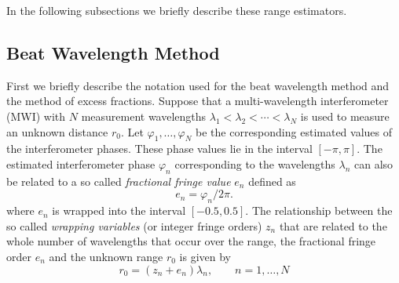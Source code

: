 In the following subsections we briefly describe these range estimators. 
\subsection{Beat Wavelength Method}
First we briefly describe the notation used for the beat wavelength method and the method of excess fractions. Suppose that a multi-wavelength interferometer (MWI) with $N$  measurement wavelengths $\lambda_1< \lambda_2< \cdots< \lambda_N$ is used to measure an unknown distance $r_0$. Let $\varphi_1,\ldots,\varphi_N$ be the corresponding estimated values of the interferometer phases. These phase values lie in the interval $[-\pi, \pi]$. The estimated interferometer phase $\varphi_n$ corresponding to the wavelengths $\lambda_n$ can also be related to a so called \emph{fractional fringe value} $e_n$ defined as~\cite{Falaggis-generalized-th-of-PU-2012}
\[
e_n = \varphi_n/2\pi.
\]
where $e_n$ is wrapped into the interval $[-0.5, 0.5]$. The relationship between the so called \emph{wrapping variables} (or integer fringe orders) $z_n$ that are related to the whole number of wavelengths that occur over the range, the fractional fringe order $e_n$ and the unknown range $r_0$ is given by
\begin{equation}\label{eq:r0-zn-yn}
r_0 = (z_n + e_n)\lambda_n, \qquad n=1,\ldots,N
\end{equation}


